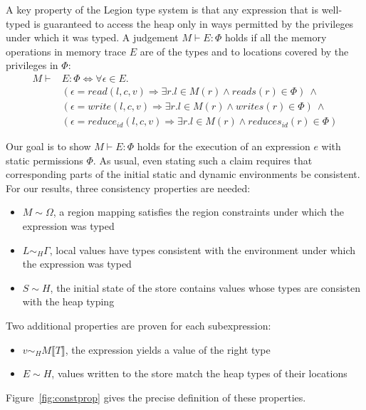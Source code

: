 A key property of the Legion type system is that any expression that is well-typed is
guaranteed to access the heap only in ways permitted by the privileges under which it was typed.
A judgement $M \vdash E : \Phi$ holds if all the memory operations in memory trace $E$ are of the types and
to locations covered by the privileges in $\Phi$:
\[ 
\begin{array}{rl}
M \vdash & E : \Phi \Leftrightarrow \forall \epsilon \in E. \\
& (\epsilon = read(l, c, v) \Rightarrow \exists r. l \in M(r) \wedge reads(r) \in \Phi)\ \wedge \\
& (\epsilon = write(l, c, v) \Rightarrow \exists r. l \in M(r) \wedge writes(r) \in \Phi)\ \wedge \\
& (\epsilon = reduce_{id}(l, c, v) \Rightarrow \exists r. l \in M(r) \wedge reduces_{id}(r) \in \Phi)
\end{array}
\]

Our goal is to show $M \vdash E : \Phi$ holds for the execution of an expression $e$ with static permissions $\Phi$.
As usual, even stating such a claim requires that corresponding parts of the initial static and dynamic environments be consistent.
For our results, three consistency properties are needed:
\begin{itemize}
\item $M \sim \Omega$, a region mapping satisfies the region constraints under which the expression was typed
\item $L \sim_H \Gamma$, local values have types consistent with the environment under which the expression was typed
\item $S \sim H$, the initial state of the store contains values whose types are consisten with the heap typing
\end{itemize}

Two additional properties are proven for each subexpression:
\begin{itemize}
\item $v \sim_H M \llbracket T \rrbracket$, the expression yields a value of the right type
\item $E \sim H$, values written to the store match the heap types of their locations
\end{itemize}
Figure~\ref{fig:constprop} gives the precise definition of these properties.

